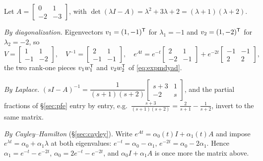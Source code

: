 \documentclass[11pt]{article}
\begin{document}
\begin{example}\label{ex:expm3}
Let $A=\begin{bmatrix}0&1\\-2&-3\end{bmatrix}$, with
$\det(\lambda I-A)=\lambda^{2}+3\lambda+2=(\lambda+1)(\lambda+2)$.

\emph{By diagonalization.} Eigenvectors $v_1=(1,-1)^{\mathsf{T}}$ for $\lambda_1=-1$ and
$v_2=(1,-2)^{\mathsf{T}}$ for $\lambda_2=-2$, so
\[
   V=\begin{bmatrix}1&1\\-1&-2\end{bmatrix},\quad
   V^{-1}=\begin{bmatrix}2&1\\-1&-1\end{bmatrix},\quad
   e^{At}=e^{-t}\begin{bmatrix}2&1\\-2&-1\end{bmatrix}
         +e^{-2t}\begin{bmatrix}-1&-1\\2&2\end{bmatrix},
\]
the two rank-one pieces $v_1w_1^{\mathsf{T}}$ and $v_2w_2^{\mathsf{T}}$ of \eqref{eq:expmdyad}.

\emph{By Laplace.} $(sI-A)^{-1}=\dfrac{1}{(s+1)(s+2)}\begin{bmatrix}s+3&1\\-2&s\end{bmatrix}$,
and the partial fractions of \S\ref{sec:pfe} entry by entry, e.g.\
$\frac{s+3}{(s+1)(s+2)}=\frac{2}{s+1}-\frac{1}{s+2}$, invert to the same matrix.

\emph{By Cayley--Hamilton} (\S\ref{sec:cayley}). Write $e^{At}=\alpha_0(t)I+\alpha_1(t)A$
and impose $e^{\lambda t}=\alpha_0+\alpha_1\lambda$ at both eigenvalues:
$e^{-t}=\alpha_0-\alpha_1$, $e^{-2t}=\alpha_0-2\alpha_1$. Hence
$\alpha_1=e^{-t}-e^{-2t}$, $\alpha_0=2e^{-t}-e^{-2t}$, and
$\alpha_0I+\alpha_1A$ is once more the matrix above.
\end{example}
\end{document}
